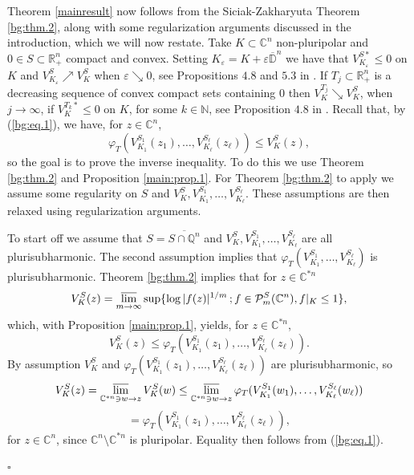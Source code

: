 \documentclass[a4paper,12pt,leqno,english]{article}
\numberwithin{equation}{section}
\newenvironment{prooftx}[1]{\medbreak\noindent{\bf 
    #1:}\rm}{\hfill$\square$\rm}
\begin{document}
Theorem \ref{mainresult} now follows from the Siciak-Zakharyuta Theorem \ref{bg:thm.2},
    along with some regularization arguments discussed in the introduction, which we will now restate.
Take $K \subset \mathbb{C}^n$ non-pluripolar and $0 \in S \subset \mathbb{R}_+^n$ compact and convex.
Setting $K_\varepsilon = K + \varepsilon \overline{\mathbb{D}}^n$ we have that $V^{S*}_{K_\varepsilon} \leq 0$ on $K$ and 
    $V^S_{K_\varepsilon} \nearrow V^S_K$ when $\varepsilon \searrow 0$,
    see Propositions $4.8$ and $5.3$ in \cite{MagSigSigSno:2023}.
If $T_j \subset \mathbb{R}_+^n$ is a decreasing sequence of convex compact sets containing $0$ then
    $V^{T_j}_K \searrow V^S_K$, when $j \rightarrow \infty$, if $V^{T_k*}_K \leq 0$ on $K$, for some $k \in \mathbb{N}$,
    see Proposition $4.8$ in \cite{MagSigSigSno:2023}.
\begin{prooftx}{Proof of Theorem \ref{mainresult}}
    Recall that, by (\ref{bg:eq.1}), we have, for $z \in \mathbb{C}^n$,
\begin{equation*}
    \varphi_T(V^{S_1}_{K_1}(z_1), \dots, V^{S_\ell}_{K_\ell}(z_\ell)) \leq V^S_K(z),
\end{equation*}
so the goal is to prove the inverse inequality.
To do this we use Theorem \ref{bg:thm.2} and Proposition \ref{main:prop.1}.
For Theorem \ref{bg:thm.2} to apply we assume some regularity on $S$ and $V^S_K, V^{S_1}_{K_1}, \dots, V^{S_\ell}_{K_\ell}$.
These assumptions are then relaxed using regularization arguments.

To start off we assume that $S = \overline{S \cap \mathbb{Q}^n}$ and 
    $V^S_K, V^{S_1}_{K_1}, \dots, V^{S_\ell}_{K_\ell}$ are all plurisubharmonic.
The second assumption implies that $\varphi_T(V^{S_1}_{K_1}, \dots, V^{S_\ell}_{K_\ell})$ is plurisubharmonic.
Theorem \ref{bg:thm.2} implies that for $z \in \mathbb{C}^{*n}$
\begin{equation*}
    V^S_K(z)
    =
    \varlimsup_{m \rightarrow \infty}
        \sup\{\log|f(z)|^{1/m}\,; f \in \mathcal{P}^S_m(\mathbb{C}^n), f|_K \leq 1\},
\end{equation*}
which, with Proposition \ref{main:prop.1}, yields, for $z \in \mathbb{C}^{*n}$,
\begin{equation*}
    V^S_K(z)
    \leq  
    \varphi_T(V^{S_1}_{K_1}(z_1), \dots, V^{S_\ell}_{K_\ell}(z_\ell)).
\end{equation*}
By assumption $V^S_K$ and $\varphi_T(V^{S_1}_{K_1}(z_1), \dots, V^{S_\ell}_{K_\ell}(z_\ell))$ are plurisubharmonic, so
\begin{equation*}
    V^S_K(z)
    =
    \varlimsup_{\mathbb{C}^{*n} \ni w \rightarrow z}
        V^S_K(w)
    \leq
    \varlimsup_{\mathbb{C}^{*n} \ni w \rightarrow z}
        \varphi_T(V^{S_1}_{K_1}(w_1), \dots, V^{S_\ell}_{K_\ell}(w_\ell))
\end{equation*}
\begin{equation*}
    =
    \varphi_T(V^{S_1}_{K_1}(z_1), \dots, V^{S_\ell}_{K_\ell}(z_\ell)),
\end{equation*}
for $z \in \mathbb{C}^n$, since $\mathbb{C}^n \setminus \mathbb{C}^{*n}$ is pluripolar.
Equality then follows from (\ref{bg:eq.1}).


\end{prooftx}
\end{document}
